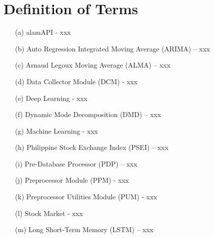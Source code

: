 \section{Definition of Terms}
\label{sec:def_terms}
\begin{itemize}
    \item[(a)] alamAPI - xxx
    \item[(b)] Auto Regression Integrated Moving Average (ARIMA) – xxx
    \item[(c)] Arnaud Legoux Moving Average (ALMA) – xxx
    \item[(d)] Data Collector Module (DCM) - xxx
    \item[(e)] Deep Learning - xxx
    \item[(f)] Dynamic Mode Decomposition (DMD) – xxx
    \item[(g)] Machine Learning - xxx
    \item[(h)] Philippine Stock Exchange Index (PSEI) – xxx
    \item[(i)] Pre-Database Processor (PDP) – xxx
    \item[(j)] Preprocessor Module (PPM) - xxx
    \item[(k)] Preprocessor Utilities Module (PUM) - xxx
    \item[(l)] Stock Market - xxx
    \item[(m)] Long Short-Term Memory (LSTM) – xxx 
\end{itemize}